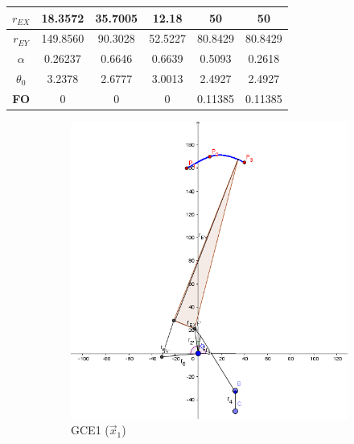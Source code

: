 \begin{table}
\begin{tabular}{|c|c|c|c|c|c|}
		\hline
		$r_{EX}$       & 18.3572  &35.7005& 12.18      & 50           & 50           \\ 
		\hline
		$r_{EY}$       & 149.8560  &90.3028& 52.5227    & 80.8429  & 80.8429      \\ 
		\hline
		$\alpha$     & 0.26237  &0.6646& 0.6639     & 0.5093  & 0.2618       \\ 
		\hline
		$\theta_0$    & 3.2378  &2.6777 &3.0013     & 2.4927  & 2.4927       \\ 
		\hline
	\textbf{	FO   }     & 0     &0       & 0          & 0.11385  & 0.11385  \\
		\hline
	\end{tabular}
\end{table}


\begin{figure}
	\centering
	\begin{subfigure}[b]{0.45\linewidth}
		\includegraphics[width=\linewidth]{Figures/GCE1}
		\caption{GCE1 ($\vec{x}_1$)} \label{fig:G1} 
	\end{subfigure}
	\begin{subfigure}[b]{0.45\linewidth}

\end{subfigure}
\end{figure}

